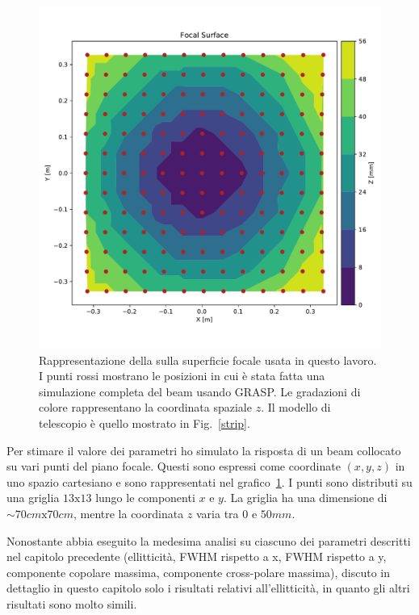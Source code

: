 \documentclass[12pt,a4paper,final]{book}
\begin{document}
\begin{figure}[!ht]
	\centering
	\includegraphics[scale=0.6]{../figures/ContourPlot_z.pdf}
	\caption{Rappresentazione della sulla superficie focale usata in questo lavoro. I punti rossi mostrano le posizioni in cui è stata fatta una simulazione completa del beam usando GRASP. Le gradazioni di colore rappresentano la coordinata spaziale $z$. Il modello di telescopio è quello mostrato in Fig.~\ref{strip}.}
	\label{cplot_fs}
\end{figure}

Per stimare il valore dei parametri ho simulato la risposta di un beam collocato su vari punti del piano focale. Questi sono espressi come coordinate $(x,y,z)$ in uno spazio cartesiano e sono rappresentati nel grafico~\ref{cplot_fs}.
I punti sono distributi su una griglia $13\text{x}13$ lungo le componenti $x$ e $y$. La griglia ha una dimensione di $\sim 70 \unit{cm}\text{x}70 \unit{cm}$, mentre la coordinata $z$ varia tra $0$ e $50 \unit{mm}$.


Nonostante abbia eseguito la medesima analisi su ciascuno dei parametri descritti nel capitolo precedente (ellitticità, FWHM rispetto a x, FWHM rispetto a y, componente copolare massima, componente cross-polare massima), discuto in dettaglio in questo capitolo solo i risultati relativi all'ellitticità, in quanto gli altri risultati sono molto simili.
\end{document}
